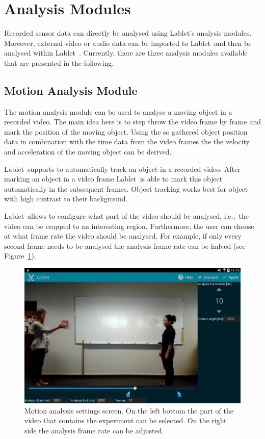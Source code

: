 \documentclass{sigchi}
\newcommand{\ie}{i.e.,\ }
\newcommand{\lablet}{Lablet\ }
\begin{document}
\section{Analysis Modules}\label{sec:AnalysisModules}
Recorded sensor data can directly be analysed using Lablet's analysis modules.
Moreover, external video or audio data can be imported to \lablet and then be analysed within \lablet.
Currently, there are three analysis modules available that are presented in the following.

\subsection{Motion Analysis Module}
The motion analysis module can be used to analyse a moving object in a recorded video.
The main idea here is to step throw the video frame by frame and mark the position of the moving object.
Using the so gathered object position data in combination with the time data from the video frames the the velocity and acceleration of the moving object can be derived.

\lablet supports to automatically track an object in a recorded video.
After marking an object in a video frame \lablet is able to mark this object automatically in the subsequent frames.
Object tracking works best for object with high contrast to their background.

\lablet allows to configure what part of the video should be analysed, \ie the video can be cropped to an interesting region.
Furthermore, the user can choose at what frame rate the video should be analysed.
For example, if only every second frame needs to be analysed the analysis frame rate can be halved (see Figure~\ref{fig:MotionAnalysisSettingsScreen}).

\begin{figure}
  \centering
  \includegraphics[width=.99\columnwidth]{MotionAnalysisSettings}
  \caption{Motion analysis settings screen.
  On the left bottom the part of the video that contains the experiment can be selected.
On the right side the analysis frame rate can be adjusted.\label{fig:MotionAnalysisSettingsScreen}}
\end{figure}
\end{document}
